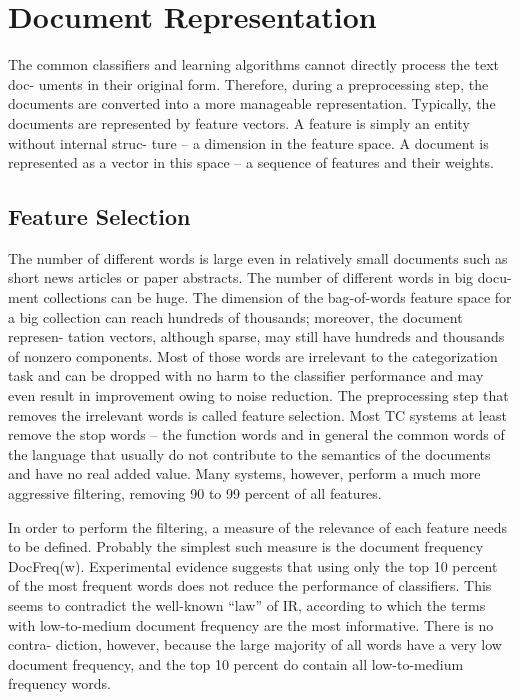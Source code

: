 \documentclass[12pt]{book}
\begin{document}
\section{Document Representation}
The common classifiers and learning algorithms cannot directly process the text doc- uments in their original form. Therefore, during a preprocessing step, the documents are converted into a more manageable representation. Typically, the documents are represented by feature vectors. A feature is simply an entity without internal struc- ture – a dimension in the feature space. A document is represented as a vector in this space – a sequence of features and their weights.

\subsection{Feature Selection}

The number of different words is large even in relatively small documents such as short news articles or paper abstracts. The number of different words in big docu- ment collections can be huge. The dimension of the bag-of-words feature space for a big collection can reach hundreds of thousands; moreover, the document represen- tation vectors, although sparse, may still have hundreds and thousands of nonzero components.
Most of those words are irrelevant to the categorization task and can be dropped with no harm to the classifier performance and may even result in improvement owing to noise reduction. The preprocessing step that removes the irrelevant words is called feature selection. Most TC systems at least remove the stop words – the function words and in general the common words of the language that usually do not contribute to the semantics of the documents and have no real added value. Many systems, however, perform a much more aggressive filtering, removing 90 to 99 percent of all features.

In order to perform the filtering, a measure of the relevance of each feature needs to be defined. Probably the simplest such measure is the document frequency DocFreq(w). Experimental evidence suggests that using only the top 10 percent of the most frequent words does not reduce the performance of classifiers. This seems to contradict the well-known “law” of IR, according to which the terms with low-to-medium document frequency are the most informative. There is no contra- diction, however, because the large majority of all words have a very low document frequency, and the top 10 percent do contain all low-to-medium frequency words.
\end{document}
